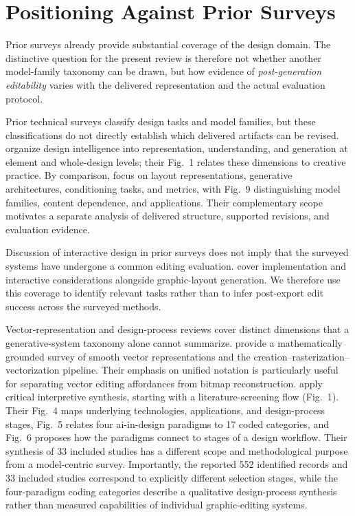 \section{Positioning Against Prior Surveys}
\label{sec:related}
Prior surveys already provide substantial coverage of the design domain.
The distinctive question for the present review is therefore not whether another model-family taxonomy can be drawn, but how evidence of \emph{post-generation editability} varies with the delivered representation and the actual evaluation protocol.

Prior technical surveys classify design tasks and model families, but these classifications do not directly establish which delivered artifacts can be revised.
\citet{huang2023survey} organize design intelligence into representation, understanding, and generation at element and whole-design levels; their Fig.~1 relates these dimensions to creative practice.
By comparison, \citet{shi2023layoutsurvey} focus on layout representations, generative architectures, conditioning tasks, and metrics, with Fig.~9 distinguishing model families, content dependence, and applications.
Their complementary scope motivates a separate analysis of delivered structure, supported revisions, and evaluation evidence.

Discussion of interactive design in prior surveys does not imply that the surveyed systems have undergone a common editing evaluation.
\citet{liu2024graphiclayoutsurvey} cover implementation and interactive considerations alongside graphic-layout generation.
We therefore use this coverage to identify relevant tasks rather than to infer post-export edit success across the surveyed methods.

Vector-representation and design-process reviews cover distinct dimensions that a generative-system taxonomy alone cannot summarize.
\citet{tian2024vectorsurvey} provide a mathematically grounded survey of smooth vector representations and the creation--rasterization--vectorization pipeline.
Their emphasis on unified notation is particularly useful for separating vector editing affordances from bitmap reconstruction.
\citet{li2024criticalsurvey} apply critical interpretive synthesis, starting with a literature-screening flow (Fig.~1).
Their Fig.~4 maps underlying technologies, applications, and design-process stages, Fig.~5 relates four \ac{ai}-in-design paradigms to 17 coded categories, and Fig.~6 proposes how the paradigms connect to stages of a design workflow.
Their synthesis of 33 included studies has a different scope and methodological purpose from a model-centric survey.
Importantly, the reported 552 identified records and 33 included studies correspond to explicitly different selection stages, while the four-paradigm coding categories describe a qualitative design-process synthesis rather than measured capabilities of individual graphic-editing systems.

